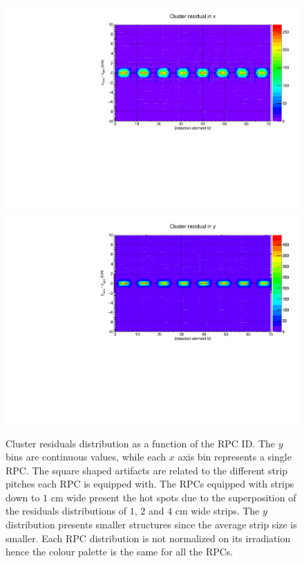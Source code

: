 \begin{figure}[!]
\begin{center}
\includegraphics[width=0.9\linewidth]{Chapters/O2/Figs/CRx.pdf}
\includegraphics[width=0.9\linewidth]{Chapters/O2/Figs/CRy.pdf}
\caption{Cluster residuals distribution as a function of the RPC ID. The $y$ bins are continuous values, while each $x$ axis bin represents a single RPC. The square shaped artifacts are related to the different strip pitches each RPC is equipped with. The RPCs equipped with strips down to $1$ cm wide present the hot spots due to the superposition of the residuals distributions of $1$, $2$ and $4$ cm wide strips. The $y$ distribution presents smaller structures since the average strip size is smaller. Each RPC distribution is not normalized on its irradiation hence the colour palette is the same for all the RPCs.}
\label{fig:MID_CR}
\end{center}
\end{figure}


